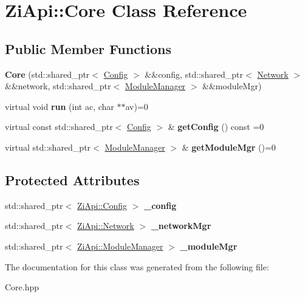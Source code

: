\hypertarget{classZiApi_1_1Core}{}\section{Zi\+Api\+::Core Class Reference}
\label{classZiApi_1_1Core}
\subsection*{Public Member Functions}
\begin{DoxyCompactItemize}
\item 
\mbox{\label{classZiApi_1_1Core_af3cd8eba1b1d05633383da50539564ba}} 
{\bfseries Core} (std\+::shared\+\_\+ptr$<$ \mbox{\hyperlink{classZiApi_1_1Config}{Config}} $>$ \&\&config, std\+::shared\+\_\+ptr$<$ \mbox{\hyperlink{classZiApi_1_1Network}{Network}} $>$ \&\&network, std\+::shared\+\_\+ptr$<$ \mbox{\hyperlink{classZiApi_1_1ModuleManager}{Module\+Manager}} $>$ \&\&module\+Mgr)
\item 
\mbox{\label{classZiApi_1_1Core_afa47f4a4077e0669330daf82538b2240}} 
virtual void {\bfseries run} (int ac, char $\ast$$\ast$av)=0
\item 
\mbox{\label{classZiApi_1_1Core_a294afe7eef866644bb80c933a9521cb2}} 
virtual const std\+::shared\+\_\+ptr$<$ \mbox{\hyperlink{classZiApi_1_1Config}{Config}} $>$ \& {\bfseries get\+Config} () const =0
\item 
\mbox{\label{classZiApi_1_1Core_ac31eb1b93966ccc7f0261f493e2b111f}} 
virtual std\+::shared\+\_\+ptr$<$ \mbox{\hyperlink{classZiApi_1_1ModuleManager}{Module\+Manager}} $>$ \& {\bfseries get\+Module\+Mgr} ()=0
\end{DoxyCompactItemize}
\subsection*{Protected Attributes}
\begin{DoxyCompactItemize}
\item 
\mbox{\label{classZiApi_1_1Core_a70b3267e291d675435d3f8ef1fcb5785}} 
std\+::shared\+\_\+ptr$<$ \mbox{\hyperlink{classZiApi_1_1Config}{Zi\+Api\+::\+Config}} $>$ {\bfseries \+\_\+config}
\item 
\mbox{\label{classZiApi_1_1Core_aebe00cf2e04b04297540d4ec643c9c5b}} 
std\+::shared\+\_\+ptr$<$ \mbox{\hyperlink{classZiApi_1_1Network}{Zi\+Api\+::\+Network}} $>$ {\bfseries \+\_\+network\+Mgr}
\item 
\mbox{\label{classZiApi_1_1Core_afc36290d5a37be55fc1334d052d66e57}} 
std\+::shared\+\_\+ptr$<$ \mbox{\hyperlink{classZiApi_1_1ModuleManager}{Zi\+Api\+::\+Module\+Manager}} $>$ {\bfseries \+\_\+module\+Mgr}
\end{DoxyCompactItemize}


The documentation for this class was generated from the following file\+:\begin{DoxyCompactItemize}
\item 
Core.\+hpp\end{DoxyCompactItemize}
